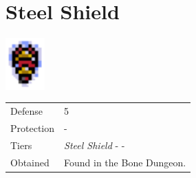 \section{Steel Shield}
\label{armor:steel_shield}

\includegraphics[height=2cm,keepaspectratio]{./resources/armors/steelshield}

\begin{longtable}{ l p{9cm} }
	Defense
	& 5
\\ %
	Protection
	& -
\\ %
	Tiers
	& \textit{Steel Shield} - \nameref{armor:venus_shield} - \nameref{armor:aegis_shield}
\\ %
	Obtained
	& Found in the Bone Dungeon.
\end{longtable}
